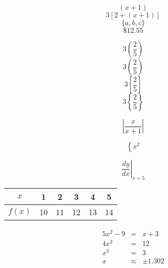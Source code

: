 \documentclass[12pt]{article}
\begin{document}
$$(x+1)$$
$$3[2+(x+1)]$$
$$\{a,b,c\}$$
$$\$12.55$$

$$3(\frac{2}{5})$$
$$3\left(\frac{2}{5}\right)$$
$$3\left[\frac{2}{5}\right]$$
$$3\left\{\frac{2}{5}\right\}$$

$$\left|\frac{x}{x+1}\right|$$

$$\left\{x^2\right.$$

$${\left.\frac{dy}{dx}\right|}_{x=5}$$

\begin{tabular}{|c|c|c|c|c|c|}
\hline
$x$ & 1 & 2 & 3 & 4 & 5\\ \hline
$f(x)$ & 10 & 11 & 12 & 13 & 14\\ \hline
\end{tabular}
\begin{eqnarray*}
5x^2-9&=&x+3\\
4x^2&=&12\\
x^3&=&3\\
x&\approx&\pm1.302
\end{eqnarray*}
\end{document}
